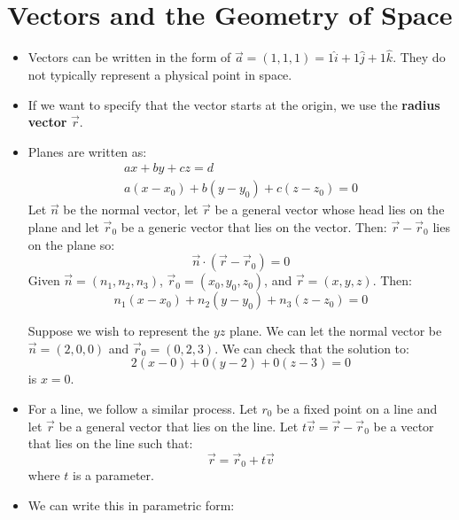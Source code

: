 \section{Vectors and the Geometry of Space}
\begin{itemize}
    \item Vectors can be written in the form of $\vec{a} = (1,1,1) = 1\hat{i}+1\hat{j}+1\hat{k}$. They do not typically represent a physical point in space.
    \item If we want to specify that the vector starts at the origin, we use the \textbf{radius vector} $\vec{r}$.
    \item Planes are written as:
    \begin{align}
        ax+by+cz=d \\ 
        a(x-x_0) + b(y-y_0)+c(z-z_0)=0
    \end{align}
    Let $\vec{n}$ be the normal vector, let $\vec{r}$ be a general vector whose head lies on the plane and let $\vec{r}_0$ be a generic vector that lies on the vector. Then: $\vec{r}-\vec{r}_0$ lies on the plane so:
    \begin{equation}
        \vec{n}\cdot (\vec{r}-\vec{r}_0) = 0
    \end{equation}
    Given $\vec{n}=(n_1,n_2,n_3)$, $\vec{r}_0 = (x_0,y_0,z_0)$, and $\vec{r}=(x,y,z)$. Then:
    \begin{equation}
        n_1(x-x_0)+n_2(y-y_0)+n_3(z-z_0) = 0
    \end{equation}
    \begin{example}
        Suppose we wish to represent the $yz$ plane. We can let the normal vector be $\vec{n}=(2,0,0)$ and $\vec{r}_0=(0,2,3)$. We can check that the solution to:
        \begin{equation}
            2(x-0)+0(y-2)+0(z-3)=0
        \end{equation}
        is $x=0$.
    \end{example}
    \item For a line, we follow a similar process. Let $r_0$ be a fixed point on a line and let $\vec{r}$ be a general vector that lies on the line. Let $t\vec{v} = \vec{r}-\vec{r}_0$ be a vector that lies on the line such that:
    \begin{equation}
        \vec{r}=\vec{r}_0 + t\vec{v}
    \end{equation}
    where $t$ is a parameter.
    \item We can write this in parametric form:
    \begin{align}

\end{align}
\end{itemize}
